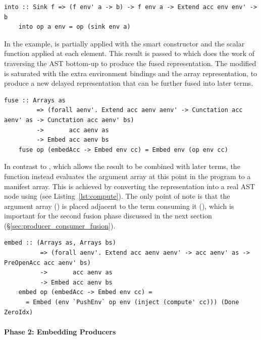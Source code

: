 \begin{lstlisting}[style=haskell,name=embedPreAcc]
    into :: Sink f => (f env' a -> b) -> f env a -> Extend acc env env' -> b
    into op a env = op (sink env a)
\end{lstlisting}

In the example,  is partially applied with the smart constructor
 and the scalar function applied at each element. This result is
passed to  which does the work of traversing the AST bottom-up to produce the fused  representation. The
modified  is saturated with the extra environment bindings and the
array representation, to produce a new delayed representation that can be
further fused into later terms.

\begin{lstlisting}[style=haskell,name=embedPreAcc]
    fuse :: Arrays as
         => (forall aenv'. Extend acc aenv aenv' -> Cunctation acc aenv' as -> Cunctation acc aenv' bs)
         ->       acc aenv as
         -> Embed acc aenv bs
    fuse op (embedAcc -> Embed env cc) = Embed env (op env cc)
\end{lstlisting}

In contrast to , which allows the result to be combined with later
terms, the  function instead evaluates the argument array at this
point in the program to a manifest array. This is achieved by converting the
 representation into a real AST node
using  (see Listing~\ref{lst:compute}). The only point of note is
that the argument array () is placed adjacent to the term consuming it
(), which is important for the second fusion phase discussed in the
next section (\S\ref{sec:producer_consumer_fusion}).

\begin{lstlisting}[style=haskell
    ,name=embedPreAcc
    ,caption={Producer fusion via bottom-up contraction of the AST}]
    embed :: (Arrays as, Arrays bs)
          => (forall aenv'. Extend acc aenv aenv' -> acc aenv' as -> PreOpenAcc acc aenv' bs)
          ->       acc aenv as
          -> Embed acc aenv bs
    embed op (embedAcc -> Embed env cc) =
      = Embed (env `PushEnv` op env (inject (compute' cc))) (Done ZeroIdx)
\end{lstlisting}

\paragraph{Phase 2: Embedding Producers}
\label{sec:embedding_producers}

